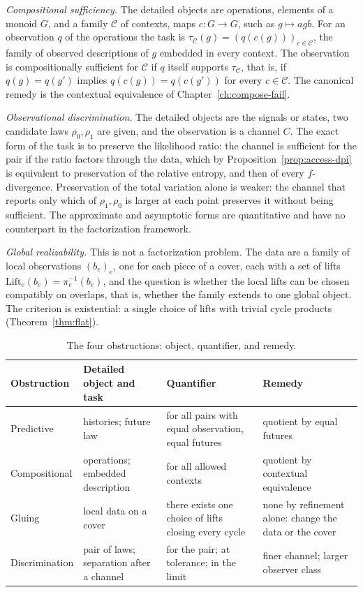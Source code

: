 \documentclass[11pt,oneside]{book}
\theoremstyle{definition}
\theoremstyle{remark}
\begin{document}
\emph{Compositional sufficiency.} The detailed objects are operations, elements of a monoid $G$, and a family $\mathcal C$ of contexts, maps $c\colon G\to G$, such as $g\mapsto agb$. For an observation $q$ of the operations the task is $\tau_{\mathcal C}(g)=(q(c(g)))_{c\in\mathcal C}$, the family of observed descriptions of $g$ embedded in every context. The observation is compositionally sufficient for $\mathcal C$ if $q$ itself supports $\tau_{\mathcal C}$, that is, if $q(g)=q(g')$ implies $q(c(g))=q(c(g'))$ for every $c\in\mathcal C$. The canonical remedy is the contextual equivalence of Chapter~\ref{ch:compose-fail}.

\emph{Observational discrimination.} The detailed objects are the signals or states, two candidate laws $\rho_0,\rho_1$ are given, and the observation is a channel $C$. The exact form of the task is to preserve the likelihood ratio: the channel is sufficient for the pair if the ratio factors through the data, which by Proposition~\ref{prop:access-dpi} is equivalent to preservation of the relative entropy, and then of every $f$-divergence. Preservation of the total variation alone is weaker: the channel that reports only which of $\rho_1,\rho_0$ is larger at each point preserves it without being sufficient. The approximate and asymptotic forms are quantitative and have no counterpart in the factorization framework.

\emph{Global realizability.} This is not a factorization problem. The data are a family of local observations $(b_e)_e$, one for each piece of a cover, each with a set of lifts $\mathrm{Lift}_e(b_e)=\pi_e^{-1}(b_e)$, and the question is whether the local lifts can be chosen compatibly on overlaps, that is, whether the family extends to one global object. The criterion is existential: a single choice of lifts with trivial cycle products (Theorem~\ref{thm:flat}).

\begin{table}[h]
\centering
\small
\begin{tabular}{p{2.6cm}p{3.0cm}p{3.7cm}p{3.6cm}}
\hline
Obstruction & Detailed object and task & Quantifier & Remedy \\
\hline
Predictive & histories; future law & for all pairs with equal observation, equal futures & quotient by equal futures \\
Compositional & operations; embedded description & for all allowed contexts & quotient by contextual equivalence \\
Gluing & local data on a cover & there exists one choice of lifts closing every cycle & none by refinement alone: change the data or the cover \\
Discrimination & pair of laws; separation after a channel & for the pair; at tolerance; in the limit & finer channel; larger observer class \\
\hline
\end{tabular}
\caption{The four obstructions: object, quantifier, and remedy.}
\end{table}
\end{document}
